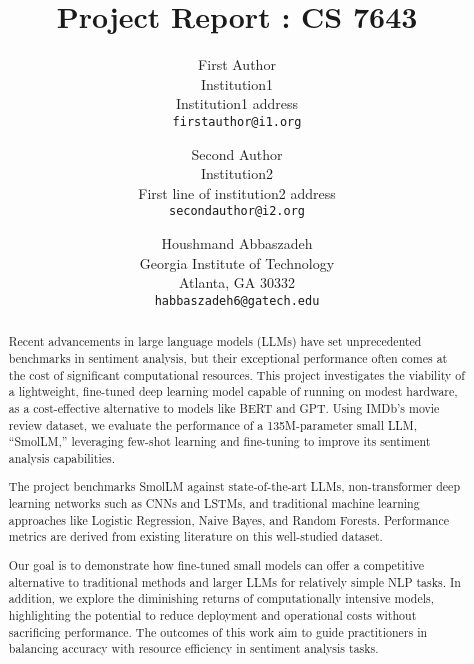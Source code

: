\documentclass[10pt,twocolumn,letterpaper]{article}
\begin{document}
\title{Project Report : CS 7643}

\author{First Author\\
Institution1\\
Institution1 address\\
{\tt\small firstauthor@i1.org}
\and
Second Author\\
Institution2\\
First line of institution2 address\\
{\tt\small secondauthor@i2.org}
\and
Houshmand Abbaszadeh\\
Georgia Institute of Technology\\
Atlanta, GA 30332\\
{\tt\small habbaszadeh6@gatech.edu}
}

\maketitle

\begin{abstract}
   Recent advancements in large language models (LLMs) have set unprecedented benchmarks in sentiment analysis, but their exceptional performance often comes at the cost of significant computational resources. This project investigates the viability of a lightweight, fine-tuned deep learning model capable of running on modest hardware, as a cost-effective alternative to models like BERT and GPT. Using IMDb’s movie review dataset, we evaluate the performance of a 135M-parameter small LLM, “SmolLM,” leveraging few-shot learning and fine-tuning to improve its sentiment analysis capabilities.

The project benchmarks SmolLM against state-of-the-art LLMs, non-transformer deep learning networks such as CNNs and LSTMs, and traditional machine learning approaches like Logistic Regression, Naive Bayes, and Random Forests. Performance metrics are derived from existing literature on this well-studied dataset.

Our goal is to demonstrate how fine-tuned small models can offer a competitive alternative to traditional methods and larger LLMs for relatively simple NLP tasks. In addition, we explore the diminishing returns of computationally intensive models, highlighting the potential to reduce deployment and operational costs without sacrificing performance. The outcomes of this work aim to guide practitioners in balancing accuracy with resource efficiency in sentiment analysis tasks.
\end{abstract}
\end{document}
